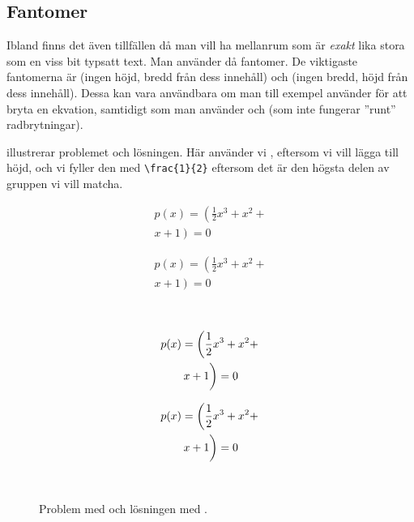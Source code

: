 \documentclass[10pt,../../a4.tex]{subfiles}
\begin{document}
\subsection{Fantomer}
Ibland finns det även tillfällen då man vill ha mellanrum som är
\emph{exakt} lika stora som en viss bit typsatt text. Man använder då
fantomer. De viktigaste fantomerna är  (ingen höjd, bredd
från dess innehåll) och  (ingen bredd, höjd från dess 
innehåll). Dessa kan vara användbara om man till exempel använder
 för att bryta en ekvation, samtidigt som man använder
 och  (som inte fungerar ”runt” radbrytningar).

 illustrerar problemet och lösningen. Här använder
vi , eftersom vi vill lägga till höjd, och vi fyller den med
\verb|\frac{1}{2}| eftersom det är den högsta delen av gruppen vi vill
matcha.

\begin{figure}[tbp]
	\centering
	\begin{minipage}{\textwidth}
		\begin{minipage}{0.4\textwidth} %
			\begin{multline}
				p(x) = \left(\frac{1}{2}x^3 + x^2 + \right. \\
				\left. x + 1 \right) = 0
			\end{multline}
		\end{minipage}
		\hfill
		\begin{minipage}{0.55\textwidth} %
\begin{latexcode}
\begin{multline}
p(x) = \left(\frac{1}{2}x^3 +
     x^2 + \right. \\
\left. x + 1 \right) = 0
\end{multline}
\end{latexcode}
		\end{minipage}
	\end{minipage}\\
	\begin{minipage}{\textwidth}
		\begin{minipage}{0.4\textwidth} %
			\begin{multline}
				p(x) = \left(\frac{1}{2}x^3 + x^2 + \right. \\
				\left. x + 1 \vphantom{\frac{1}{2}}\right) = 0
			\end{multline}
		\end{minipage}
		\hfill
		\begin{minipage}{0.55\textwidth} %
\begin{latexcode}
\begin{multline}
p(x) = \left(\frac{1}{2}x^3 +
     x^2 + \right. \\
\left. x + 1 \vphantom{
\frac{1}{2} }\right) = 0
\end{multline}
\end{latexcode}
		\end{minipage}
	\end{minipage}\\
	\caption{Problem med  och lösningen med .}
	\label{fig:phantom}
\end{figure}
\end{document}
